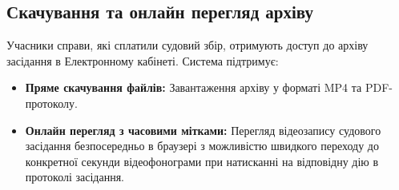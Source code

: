 \documentclass{article}
\begin{document}
\subsection{Скачування та онлайн перегляд архіву}
Учасники справи, які сплатили судовий збір, отримують доступ до архіву засідання в Електронному кабінеті. Система підтримує:
\begin{itemize}
    \item \textbf{Пряме скачування файлів:} Завантаження архіву у форматі MP4 та PDF-протоколу.
    \item \textbf{Онлайн перегляд з часовими мітками:} Перегляд відеозапису судового засідання безпосередньо в браузері з можливістю швидкого переходу до конкретної секунди відеофонограми при натисканні на відповідну дію в протоколі засідання.
\end{itemize}
\end{document}
